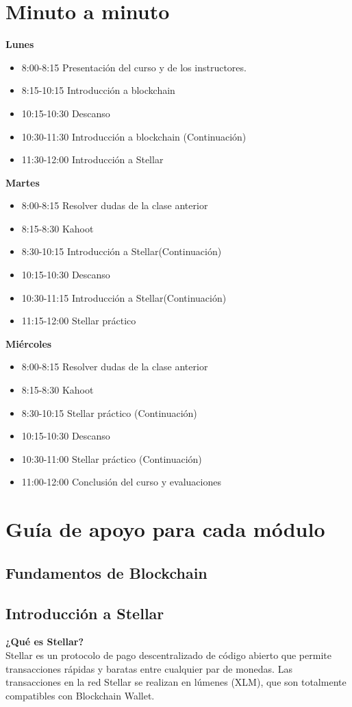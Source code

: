 \documentclass[a4paper,12pt]{/home/armando/Documentos/Cursos/LaTeX/Plantillas/lib/pub}
\begin{document}
\section{Minuto a minuto}
\textbf{Lunes}
\begin{itemize}
	\item 8:00-8:15 Presentación del curso y de los instructores.
	\item 8:15-10:15 Introducción a blockchain
	\item 10:15-10:30 Descanso
	\item 10:30-11:30 Introducción a blockchain (Continuación)
	\item 11:30-12:00 Introducción a Stellar
\end{itemize}
\textbf{Martes}
\begin{itemize}
	\item 8:00-8:15 Resolver dudas de la clase anterior
	\item 8:15-8:30 Kahoot
	\item 8:30-10:15 Introducción a Stellar(Continuación)
	\item 10:15-10:30 Descanso
	\item 10:30-11:15 Introducción a Stellar(Continuación)
	\item 11:15-12:00 Stellar práctico
\end{itemize}
\textbf{Miércoles}
\begin{itemize}
	\item 8:00-8:15 Resolver dudas de la clase anterior
	\item 8:15-8:30 Kahoot
	\item 8:30-10:15 Stellar práctico (Continuación)
	\item 10:15-10:30 Descanso
	\item 10:30-11:00 Stellar práctico (Continuación)
	\item 11:00-12:00 Conclusión del curso y evaluaciones
\end{itemize}
\section{Guía de apoyo para cada módulo}
	\subsection{Fundamentos de Blockchain}
	\subsection{Introducción a Stellar}
	\textbf{¿Qué es Stellar?}\\
	Stellar es un protocolo de pago descentralizado de código abierto que permite transacciones rápidas y baratas entre cualquier par de monedas. Las transacciones en la red Stellar se realizan en lúmenes (XLM), que son totalmente compatibles con Blockchain Wallet.\\
	
\end{document}

